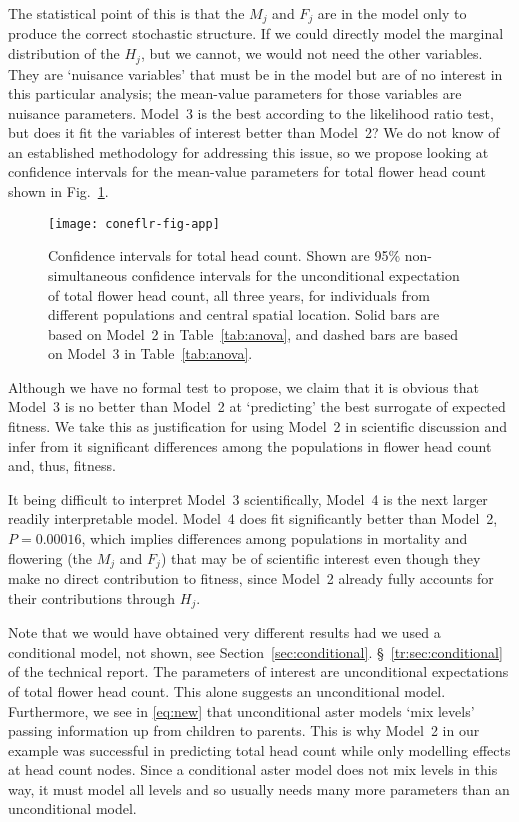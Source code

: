 The statistical point of this is that
the $M_j$ and $F_j$
are in the model only to produce the correct stochastic structure.
If we could directly model the marginal distribution of the
$H_j$, but we cannot, we would not need the other variables.
They are `nuisance variables' that must be in the
model but are of no interest in this particular analysis;
the mean-value
parameters for those variables are nuisance parameters.
Model~3 is the best according to the likelihood
ratio test, but does it fit the variables of interest better than Model~2?
We do not know of an established methodology for addressing this issue, so
we propose looking at confidence intervals for the mean-value parameters
for total flower head count
shown in Fig.~\ref{fig:plot}. %
\begin{figure}
\begin{center}
  \texttt{[image: coneflr-fig-app]}
\end{center}
\caption{Confidence intervals for total head count.  Shown are 95\% non-simultaneous
confidence intervals for the
unconditional expectation of total flower head count, all three years,
for individuals from different
populations and central spatial location.
Solid bars are based on Model~2 in Table~\ref{tab:anova},
and dashed bars are based on Model~3 in Table~\ref{tab:anova}.}
\label{fig:plot}
\end{figure}
Although we have no formal test to propose, we claim that it is obvious
that Model~3 is no better than Model~2 at `predicting' the best surrogate
of expected fitness.  We take this as justification for using Model~2 in
scientific discussion and infer from it significant differences
among the populations in flower head count and, thus, fitness.

It being difficult to interpret Model~3 scientifically, Model~4 is
the next larger readily interpretable model.
Model~4 does fit significantly better than Model~2, $P = 0.00016$, which
implies differences among populations
in mortality and flowering (the $M_j$ and $F_j$) that may be of scientific
interest even though they make no direct contribution to fitness,
since Model~2 already fully accounts for their contributions through $H_j$.

Note that we would have obtained very different results had we used
a conditional model, not shown, see
{Section~\ref{sec:conditional}.}
{\S~\ref{tr:sec:conditional} of the technical report.}
The parameters of interest are unconditional expectations
of total flower head count.  This alone suggests an unconditional
model.  Furthermore, we see in \eqref{eq:new} that unconditional
aster models `mix levels' passing information up from children to parents.
This is why Model~2 in our example was successful in predicting total head
count while only modelling \verb@pop@ effects at head count nodes.
Since a conditional aster model does not mix levels in this way,
it must model all levels and so usually needs many more parameters
than an unconditional model.

